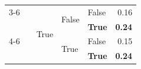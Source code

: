 \documentclass{article}
\begin{document}
\begin{table}
\begin{center}
{\begin{tabular}{@{}lllllr@{}}
    \cmidrule{3-6}
                                            &                                   & \multirow[c]{4}{*}{True}  & \multirow[c]{2}{*}{False} & False                 & 0.16 \\
                                            &                                   &                           &                           & \textbf{True}         & \textbf{0.24} \\
    \cmidrule{4-6}
                                            &                                   &                           & \multirow[c]{2}{*}{True}  & False                 & 0.15 \\
                                            &                                   &                           &                           & \textbf{True}         & \textbf{0.24} \\
    \bottomrule
\end{tabular}
}
    \end{center}
    \label{tab:past-actions-ablation-gemini-pro}
\end{table}
\end{document}
